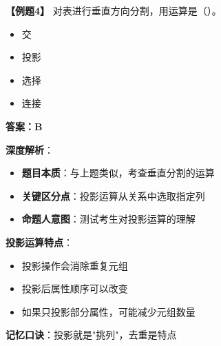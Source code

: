 \documentclass[12pt, a4paper]{article}
\newenvironment{bluebox}[1]{%
  \begin{trivlist}
  \item[\hskip\labelsep \textbf{#1}]
  \setlength{\parskip}{0.5ex}
  \setlength{\itemsep}{0.5ex}
}{%
  \end{trivlist}
}
\begin{document}
\begin{bluebox}{例题4：垂直分割运算}
	\textbf{【例题4】} 对表进行垂直方向分割，用运算是（\quad）。

	\begin{itemize}
		\item[A)] 交
		\item[B)] 投影
		\item[C)] 选择
		\item[D)] 连接
	\end{itemize}

	\textbf{答案：B}

	\textbf{深度解析}：

	\begin{itemize}
		\item \textbf{题目本质}：与上题类似，考查垂直分割的运算
		\item \textbf{关键区分点}：投影运算从关系中选取指定列
		\item \textbf{命题人意图}：测试考生对投影运算的理解
	\end{itemize}

	\textbf{投影运算特点}：

	\begin{itemize}
		\item 投影操作会消除重复元组
		\item 投影后属性顺序可以改变
		\item 如果只投影部分属性，可能减少元组数量
	\end{itemize}

	\textbf{记忆口诀}：投影就是"挑列"，去重是特点
\end{bluebox}
\end{document}
